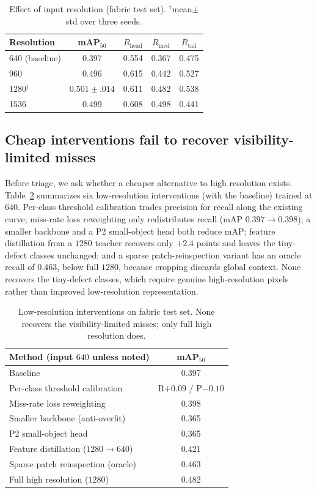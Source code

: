 \begin{table}[t]
\centering
\caption{Effect of input resolution (fabric test set). $^\dagger$mean$\pm$std
over three seeds.}
\label{tab:resolution}
\begin{tabular}{lcccc}
\toprule
Resolution & mAP$_{50}$ & $R_\text{head}$ & $R_\text{med}$ & $R_\text{tail}$ \\
\midrule
640 (baseline)     & 0.397 & 0.554 & 0.367 & 0.475 \\
960                & 0.496 & 0.615 & 0.442 & 0.527 \\
1280$^\dagger$     & $0.501{\pm}.014$ & 0.611 & 0.482 & 0.538 \\
1536               & 0.499 & 0.608 & 0.498 & 0.441 \\
\bottomrule
\end{tabular}
\end{table}

\subsection{Cheap interventions fail to recover visibility-limited misses}
Before triage, we ask whether a cheaper alternative to high resolution exists.
Table~\ref{tab:methods} summarizes six low-resolution interventions (with the baseline) trained at $640$. Per-class
threshold calibration trades precision for recall along the existing curve;
miss-rate loss reweighting only redistributes recall (mAP $0.397{\to}0.398$); a
smaller backbone and a P2 small-object head both reduce mAP; feature
distillation from a $1280$ teacher recovers only $+2.4$ points and leaves the
tiny-defect classes unchanged; and a sparse patch-reinspection variant has an
oracle recall of $0.463$, below full $1280$, because cropping discards global
context. None recovers the tiny-defect classes, which require genuine
high-resolution pixels rather than improved low-resolution representation.

\begin{table}[t]
\centering
\caption{Low-resolution interventions on fabric test set. None recovers the
visibility-limited misses; only full high resolution does.}
\label{tab:methods}
\begin{tabular}{lc}
\toprule
Method (input $640$ unless noted) & mAP$_{50}$ \\
\midrule
Baseline                              & 0.397 \\
Per-class threshold calibration       & R$+0.09$ / P$-0.10$ \\
Miss-rate loss reweighting            & 0.398 \\
Smaller backbone (anti-overfit)       & 0.365 \\
P2 small-object head                  & 0.365 \\
Feature distillation ($1280{\to}640$) & 0.421 \\
Sparse patch reinspection (oracle)    & 0.463 \\
\midrule
Full high resolution ($1280$)         & 0.482 \\
\bottomrule
\end{tabular}
\end{table}

